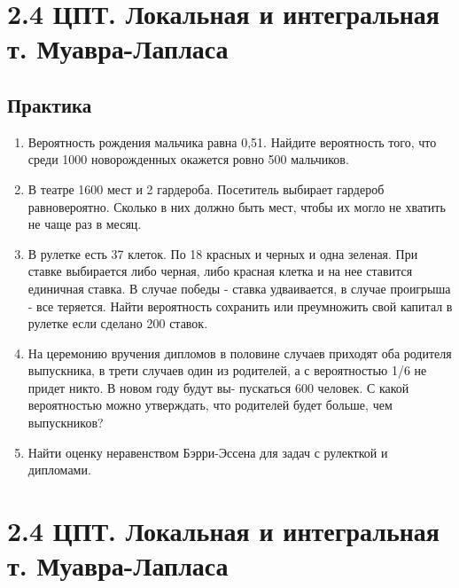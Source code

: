 \documentclass[a4paper, 14pt]{extarticle}
\begin{document}
\newpage
\section*{2.4 ЦПТ. Локальная и интегральная т. Муавра-Лапласа}
\subsection*{Практика}
\begin{enumerate}
\item Вероятность рождения мальчика равна 0,51. Найдите вероятность того, что среди 1000 новорожденных окажется ровно 500 мальчиков.
\item В театре 1600 мест и 2 гардероба. Посетитель выбирает гардероб равновероятно. Сколько в них должно быть мест, чтобы их могло не хватить не чаще раз в месяц.
\item В рулетке есть 37 клеток. По 18 красных и черных и одна зеленая. При ставке выбирается либо черная, либо красная клетка и на нее ставится единичная ставка.
В случае победы - ставка удваивается, в случае проигрыша - все теряется.
Найти вероятность сохранить или преумножить свой капитал в рулетке если сделано 200 ставок.
\item На церемонию вручения дипломов в половине случаев приходят оба родителя выпускника, в
трети случаев один из родителей, а с вероятностью 1/6 не придет никто. В новом году будут вы-
пускаться 600 человек. С какой вероятностью можно утверждать, что родителей будет больше, чем
выпускников?
\item Найти оценку неравенством Бэрри-Эссена для задач с рулекткой и дипломами.


\end{enumerate}
\newpage
\section*{2.4 ЦПТ. Локальная и интегральная т. Муавра-Лапласа}
\end{document}
